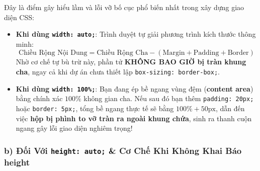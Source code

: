 \documentclass[11pt,oneside]{book}
\newcommand{\codeinline}[1]{\textcolor{accentOrange}{\texttt{#1}}}
\newcommand{\term}[1]{\textbf{\textcolor{primaryBlue}{#1}}}
\DeclareRobustCommand{\csshint}[1]{\texorpdfstring{\textcolor{accentOrange}{\textbf{\texttt{#1}}}}{#1}}
\begin{document}
\begin{noteBox}
Đây là điểm gây hiểu lầm và lỗi vỡ bố cục phổ biến nhất trong xây dựng giao diện CSS:
\begin{itemize}[leftmargin=1.2em, itemsep=3pt, parsep=0pt]
    \item \textbf{Khi dùng \codeinline{width: auto;}}: Trình duyệt tự giải phương trình kích thước thông minh:
    $$\text{Chiều Rộng Nội Dung} = \text{Chiều Rộng Cha} - (\text{Margin} + \text{Padding} + \text{Border})$$
    Nhờ cơ chế tự bù trừ này, phần tử \textbf{KHÔNG BAO GIỜ bị tràn khung cha}, ngay cả khi dự án chưa thiết lập \codeinline{box-sizing: border-box;}.
    \item \textbf{Khi dùng \codeinline{width: 100\%;}}: Bạn đang ép bề ngang vùng đệm (\term{content area}) bằng chính xác $100\%$ không gian cha. Nếu sau đó bạn thêm \codeinline{padding: 20px;} hoặc \codeinline{border: 5px;}, tổng bề ngang thực tế sẽ bằng $100\% + 50\text{px}$, dẫn đến việc \textbf{hộp bị phình to vỡ tràn ra ngoài khung chứa}, sinh ra thanh cuộn ngang gây lỗi giao diện nghiêm trọng!
\end{itemize}
\end{noteBox}

\subsubsection{b) Đối Với \csshint{height: auto;} \& Cơ Chế Khi Không Khai Báo height}
\end{document}
